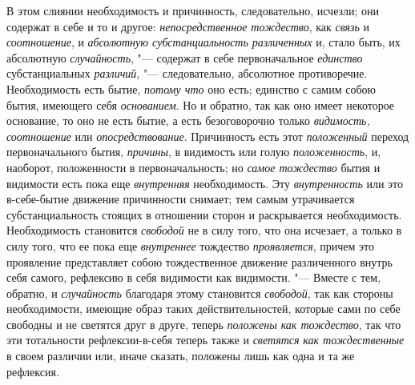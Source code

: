 \label{bkm:bm93a}В этом слиянии необходимость и причинность, следовательно,
исчезли; они содержат в себе и то и другое:
{\em непосредственное тождество}, как
{\em связь} и {\em соотношение}, и
{\em абсолютную субстанциальность различенных} и, стало
быть, их абсолютную {\em случайность}, "--- содержат в
себе первоначальное {\em единство} субстанциальных
{\em различий}, "--- следовательно, абсолютное
противоречие. Необходимость есть бытие, {\em потому
что} оно есть; единство с самим собою бытия, имеющего себя
{\em основанием}. Но и обратно, так как оно имеет
некоторое основание, то оно не есть бытие, а есть безоговорочно только
{\em видимость, соотношение} или
{\em опосредствование}. Причинность есть этот
{\em положенный} переход первоначального бытия,
{\em причины}, в видимость или голую
{\em положенность}, и, наоборот, положенности в
первоначальность; но {\em самое тождество} бытия и
видимости есть пока еще {\em внутренняя} необходимость.
Эту {\em внутренность} или это в-себе-бытие движение
причинности снимает; тем самым утрачивается субстанциальность стоящих в
отношении сторон и раскрывается необходимость. Необходимость становится
{\em свободой} не в силу того, что она исчезает, а
только в силу того, что ее пока еще {\em внутреннее}
тождество {\em проявляется}, причем это проявление
представляет собою тождественное движение различенного внутрь себя самого,
рефлексию в себя видимости как видимости. "--- Вместе с тем, обратно, и
{\em случайность} благодаря этому становится
{\em свободой}, так как стороны необходимости, имеющие
образ таких действительностей, которые сами по себе свободны и не светятся
друг в друге, теперь {\em положены как тождество}, так
что эти тотальности рефлексии-в-себя теперь также и
{\em светятся} {\em как
тождественные} в своем различии или, иначе сказать, положены лишь как одна
и та же рефлексия.


